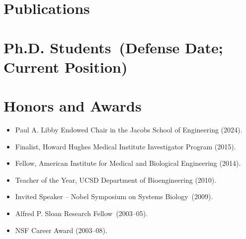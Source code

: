 \documentclass[11pt,a4paper,sans]{moderncv}        %
\makeatletter
\renewcommand*{\bibliographyitemlabel}{\@biblabel{\arabic{enumiv}}}
\makeatother
\begin{document}
\section{Publications} %
\vspace{-.2in}
\renewcommand{\refname}{}
\nocite{*}

%
%  

%
%   


    
 


\section{Ph.D. Students~(Defense Date; Current Position)}


\section{Honors and Awards}
\begin{itemize}

\item Paul A. Libby Endowed Chair in the Jacobs School of Engineering (2024). 

\item Finalist, Howard Hughes Medical Institute Investigator Program (2015). 

\item Fellow, American Institute for Medical and Biological Engineering (2014). 

\item Teacher of the Year, UCSD Department of Bioengineering (2010).

\item Invited Speaker -- Nobel Symposium on Systems Biology~(2009).

\item Alfred P. Sloan Research Fellow~(2003--05).

\item NSF Career Award (2003--08).

\end{itemize}
\end{document}
